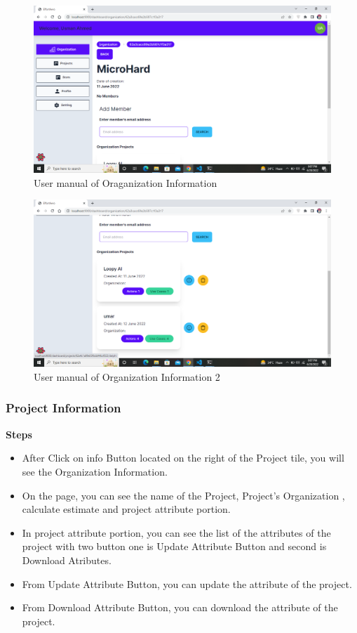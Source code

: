 \begin{figure}[H]
    \centering
    \includegraphics[scale=0.4]{./diagrams/user-manual/Screenshot (20).png}
    \caption{User manual of Oraganization Information}
    \label{fig:user-1}
\end{figure}

\begin{figure}[H]
    \centering
    \includegraphics[scale=0.4]{./diagrams/user-manual/Screenshot (21).png}
    \caption{User manual of Organization Information 2}
    \label{fig:user-1}

\end{figure}


\subsubsection{Project Information}
\textbf{Steps}
\begin{itemize}
    \item After Click on info Button located on the right of the Project tile, you will see the Organization Information.
    \item On the page, you can see the name of the Project, Project's Organization , calculate estimate and project attribute portion.
    \item In project attribute portion, you can see the list of the attributes of the project with two button one is Update Attribute Button and second is Download Atributes.
    \item From Update Attribute Button, you can update the attribute of the project.
    \item From Download Attribute Button, you can download the attribute of the project.

\end{itemize}

